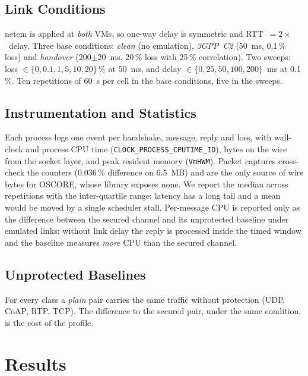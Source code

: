 \documentclass[conference]{IEEEtran}
\begin{document}
\subsection{Link Conditions}
netem is applied at \emph{both} VMs, so one-way delay is symmetric and
RTT~$=2\times$~delay. Three base conditions: \emph{clean} (no emulation),
\emph{3GPP~C2} (50~ms, 0.1\,\% loss) and \emph{handover} (200$\pm$20~ms,
20\,\% loss with 25\,\% correlation). Two sweeps: loss $\in\{0, 0.1, 1, 5,
10, 20\}$\,\% at 50~ms, and delay $\in\{0, 25, 50, 100, 200\}$~ms at
0.1\,\%. Ten repetitions of 60~s per cell in the base conditions, five in the
sweeps.

\subsection{Instrumentation and Statistics}
Each process logs one event per handshake, message, reply and loss, with
wall-clock and process CPU time (\texttt{CLOCK\_PROCESS\_CPUTIME\_ID}),
bytes on the wire from the socket layer, and peak resident memory
(\texttt{VmHWM}). Packet captures cross-check the counters (0.036\,\%
difference on 6.5~MB) and are the only source of wire bytes for OSCORE,
whose library exposes none. We report the median across repetitions with the
inter-quartile range; latency has a long tail and a mean would be moved by a
single scheduler stall. Per-message CPU is reported only as the difference
between the secured channel and its unprotected baseline under emulated
links: without link delay the reply is processed inside the timed window and
the baseline measures \emph{more} CPU than the secured channel.

\subsection{Unprotected Baselines}
For every class a \emph{plain} pair carries the same traffic without
protection (UDP, CoAP, RTP, TCP). The difference to the secured pair, under
the same condition, is the cost of the profile.

\section{Results}
\label{sec:results}
\end{document}

